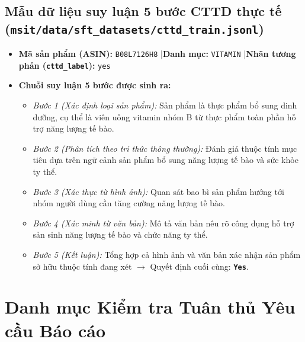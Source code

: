 \documentclass[conference,10pt]{IEEEtran}
\begin{document}
\subsection{Mẫu dữ liệu suy luận 5 bước CTTD thực tế (\texttt{msit/data/sft\_datasets/cttd\_train.jsonl})}
\begin{itemize}
    \item \textbf{Mã sản phẩm (ASIN):} \texttt{B08L7126H8} \quad|\quad \textbf{Danh mục:} \texttt{VITAMIN} \quad|\quad \textbf{Nhãn tương phản (\texttt{cttd\_label}):} \texttt{yes}
    \item \textbf{Chuỗi suy luận 5 bước được sinh ra:}
    \begin{itemize}
        \item \textit{Bước 1 (Xác định loại sản phẩm):} Sản phẩm là thực phẩm bổ sung dinh dưỡng, cụ thể là viên uống vitamin nhóm B từ thực phẩm toàn phần hỗ trợ năng lượng tế bào.
        \item \textit{Bước 2 (Phân tích theo tri thức thông thường):} Đánh giá thuộc tính mục tiêu dựa trên ngữ cảnh sản phẩm bổ sung năng lượng tế bào và sức khỏe ty thể.
        \item \textit{Bước 3 (Xác thực từ hình ảnh):} Quan sát bao bì sản phẩm hướng tới nhóm người dùng cần tăng cường năng lượng tế bào.
        \item \textit{Bước 4 (Xác minh từ văn bản):} Mô tả văn bản nêu rõ công dụng hỗ trợ sản sinh năng lượng tế bào và chức năng ty thể.
        \item \textit{Bước 5 (Kết luận):} Tổng hợp cả hình ảnh và văn bản xác nhận sản phẩm sở hữu thuộc tính đang xét $\rightarrow$ Quyết định cuối cùng: \textbf{\texttt{Yes}}.
    \end{itemize}
\end{itemize}

\section{Danh mục Kiểm tra Tuân thủ Yêu cầu Báo cáo}
\end{document}
